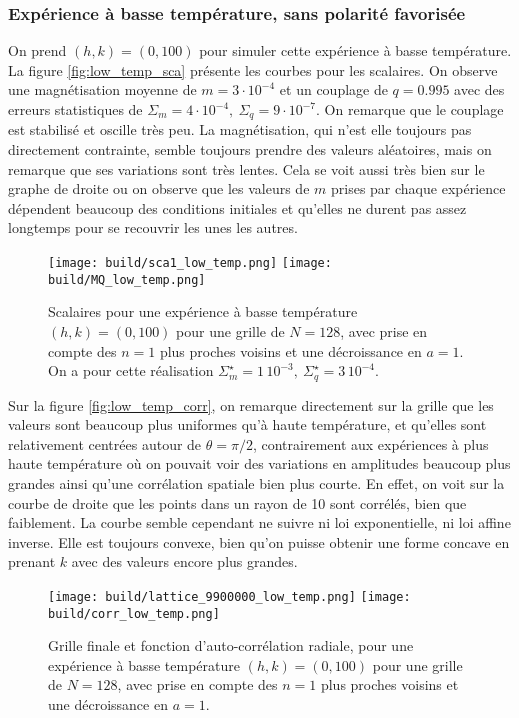 \documentclass[a4paper, 11pt]{article}
\begin{document}
\subsubsection{Expérience à basse température, sans polarité favorisée }

On prend  $(h, k) = (0, 100)$ pour simuler cette expérience à basse température. La figure
\ref{fig:low_temp_sca} présente les courbes pour les scalaires. On observe une magnétisation moyenne
de $m = 3\cdot10^{-4}$ et un couplage de $q=0.995$ avec des erreurs statistiques de $\Sigma_m =
4\cdot10^{-4}, ~ \Sigma_q = 9\cdot10^{-7}$. On remarque que le couplage est stabilisé et oscille
très peu. La magnétisation, qui n'est elle toujours pas directement contrainte, semble toujours
prendre des valeurs aléatoires, mais on remarque que ses variations sont très lentes. Cela se voit
aussi très bien sur le graphe de droite ou on observe que les valeurs de $m$ prises par chaque
expérience dépendent beaucoup des conditions initiales et qu'elles ne durent pas assez longtemps
pour se recouvrir les unes les autres. 

\begin{figure}
    \centering
    \texttt{[image: build/sca1\_low\_temp.png]}
    \texttt{[image: build/MQ\_low\_temp.png]}
    \caption{Scalaires pour une expérience à basse température $(h, k) = (0, 100)$ pour une
    grille de $N=128$, avec prise en compte des $n=1$ plus proches voisins et une décroissance en
    $a=1$. On a pour cette réalisation $\Sigma_m^\star = 1\,10^{-3},~ \Sigma_q^\star = 3\,10^{-4}$.}
    \label{fig:low_en_sca}
\end{figure}

Sur la figure \ref{fig:low_temp_corr}, on remarque directement sur la grille que les valeurs sont
beaucoup plus uniformes qu'à haute température, et qu'elles sont relativement centrées autour de
$\theta = \pi/2$, contrairement aux expériences à plus haute température où on pouvait voir des
variations en amplitudes beaucoup plus grandes ainsi qu'une corrélation spatiale bien plus courte.
En effet, on voit sur la courbe de droite que les points dans un rayon de 10 sont corrélés, bien que
faiblement. La courbe semble cependant ne suivre ni loi exponentielle, ni loi affine inverse. Elle
est toujours convexe, bien qu'on puisse obtenir une forme concave en prenant $k$ avec des valeurs
encore plus grandes. 

\begin{figure}
    \centering
    \texttt{[image: build/lattice\_9900000\_low\_temp.png]}
    \texttt{[image: build/corr\_low\_temp.png]}
    \caption{Grille finale et fonction d'auto-corrélation radiale, pour une expérience à basse
    température $(h, k) = (0, 100)$ pour une grille de $N=128$, avec prise en compte des
    $n=1$ plus proches voisins et une décroissance en $a=1$.} 
    \label{fig:low_en_corr}
\end{figure}
\end{document}
